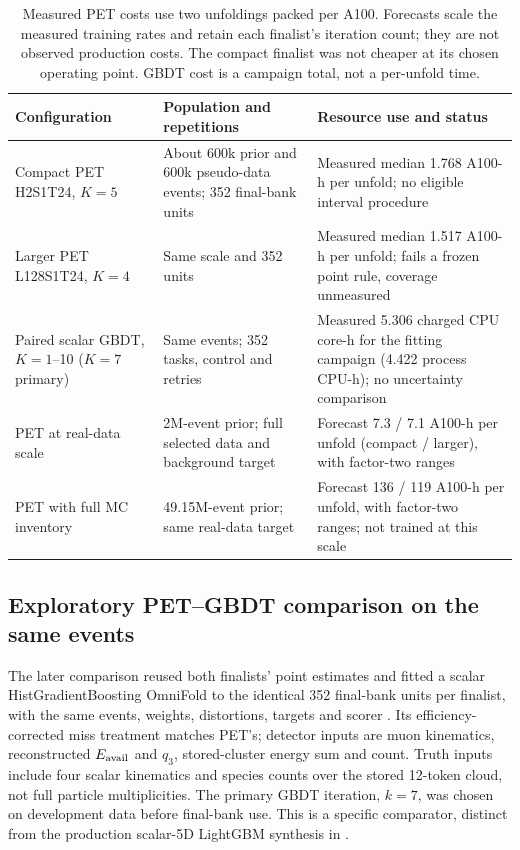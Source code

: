 \begin{table}[htbp]
\centering\footnotesize
\begin{tabular}{@{}p{}p{}p{}@{}}
\toprule
Configuration & Population and repetitions & Resource use and status \\
\midrule
Compact PET H2S1T24, $K=5$ & About 600k prior and 600k pseudo-data events; 352 final-bank units & Measured median 1.768 A100-h per unfold; no eligible interval procedure \\
\addlinespace
Larger PET L128S1T24, $K=4$ & Same scale and 352 units & Measured median 1.517 A100-h per unfold; fails a frozen point rule, coverage unmeasured \\
\addlinespace
Paired scalar GBDT, $K=1$--10 ($K=7$ primary) & Same events; 352 tasks, control and retries & Measured 5.306 charged CPU core-h for the fitting campaign (4.422 process CPU-h); no uncertainty comparison \\
\addlinespace
PET at real-data scale & 2M-event prior; full selected data and background target & Forecast 7.3 / 7.1 A100-h per unfold (compact / larger), with factor-two ranges \\
\addlinespace
PET with full MC inventory & 49.15M-event prior; same real-data target & Forecast 136 / 119 A100-h per unfold, with factor-two ranges; not trained at this scale \\
\bottomrule
\end{tabular}
\caption{Measured PET costs use two unfoldings packed per A100. Forecasts scale the measured training rates and retain each finalist's iteration count; they are not observed production costs. The compact finalist was not cheaper at its chosen operating point. GBDT cost is a campaign total, not a per-unfold time.}
\label{tab:pet-cost}
\end{table}

\subsection{Exploratory PET--GBDT comparison on the same events}
\label{sec:pet-gbdt-paired}

The later comparison reused both finalists' point estimates and fitted a scalar HistGradientBoosting OmniFold to the identical 352 final-bank units per finalist, with the same events, weights, distortions, targets and scorer \cite{PETGBDT2026}. Its efficiency-corrected miss treatment matches PET's; detector inputs are muon kinematics, reconstructed $E_{\mathrm{avail}}$ and $q_3$, stored-cluster energy sum and count. Truth inputs include four scalar kinematics and species counts over the stored 12-token cloud, not full particle multiplicities. The primary GBDT iteration, $k=7$, was chosen on development data before final-bank use. This is a specific comparator, distinct from the production scalar-5D LightGBM synthesis in .

